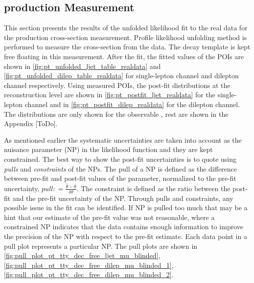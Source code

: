 \subsection{\tty production Measurement}
\label{sec:tty_prod_measurement}

This section presents the results of the unfolded likelihood fit to the real data for the \tty production cross-section measurement. Profile likelihood unfolding method is performed to measure the cross-section from the data. The \tty decay template is kept free floating in this measurement.
After the fit, the fitted values of the POIs are shown in \cref{fig:pt_unfolded_ljet_table_realdata} and \cref{fig:pt_unfolded_dilep_table_realdata} for single-lepton channel and dilepton channel respectively. Using measured POIs, the post-fit distributions at the reconstruction level are shown in \cref{fig:pt_postfit_ljet_realdata} for the single-lepton channel and in \cref{fig:pt_postfit_dilep_realdata} for the dilepton channel. The distributions are only shown for the observable \ptgamma, rest are shown in the Appendix [ToDo].

As mentioned earlier the systematic uncertainties are taken into account as the nuisance parameter (NP) in the likelihood function and they are kept constrained. The best way to show the post-fit uncertainties is to quote using \textit{pulls} and \textit{constraints} of the NPs. The pull of a NP is defined as the difference between pre-fit and post-fit values of the parameter, normalized to the pre-fit uncertainty, $pull: = \frac{\hat{\theta}- \theta}{\delta \theta}$. The constraint is defined as the ratio between the post-fit and the pre-fit uncertainty of the NP. Through pulls and constraints, any possible issue in the fit can be identified. If NP is pulled too much that may be a hint that our estimate of the pre-fit value was not reasonable, where a constrained NP indicates that the data contains enough information to improve the precision of the NP with respect to the pre-fit estimate. Each data point in a pull plot represents a particular NP. The pull plots are shown in \cref{fig:pull_plot_pt_tty_dec_free_ljet_mu_blinded}, \cref{fig:pull_plot_pt_tty_dec_free_dilep_mu_blinded_1}, \cref{fig:pull_plot_pt_tty_dec_free_dilep_mu_blinded_2}. %

